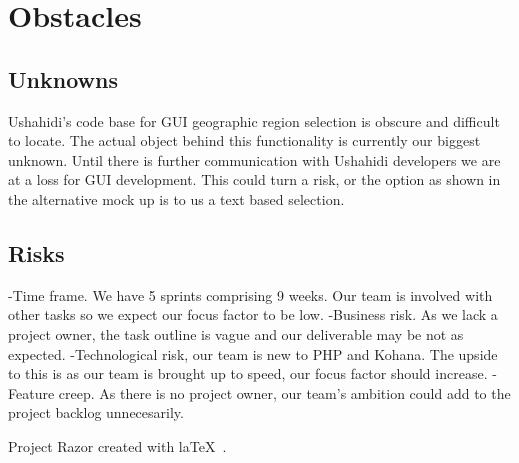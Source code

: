 \documentclass{article}
\begin{document}
\section{Obstacles}
\subsection{Unknowns}
Ushahidi's code base for GUI geographic region selection is obscure and difficult to locate. The actual object behind this functionality is currently our biggest unknown. Until there is further communication with Ushahidi developers we are at a loss for GUI development. This could turn a risk, or the option as shown in the alternative mock up is to us a text based selection.
\subsection{Risks}
-Time frame. We have 5 sprints comprising 9 weeks. Our team is involved with other tasks so we expect our focus factor to be low.
-Business risk. As we lack a project owner, the task outline is vague and our deliverable may be not as expected.
-Technological risk, our team is new to PHP and Kohana. The upside to this is as our team is brought up to speed, our focus factor should increase.
-Feature creep. As there is no project owner, our team's ambition could add to the project backlog unnecesarily.


Project Razor created with la\TeX~.
\end{document}
